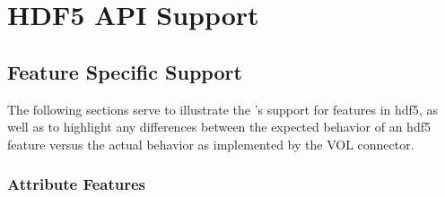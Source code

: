 \documentclass[../users_guide.tex]{subfiles}
\begin{document}
\section{HDF5 API Support}

\subsection{Feature Specific Support}


The following sections serve to illustrate the \rvc{}'s support for features in \acrshort{hdf5}, as well as to highlight any differences between the expected behavior of an \acrshort{hdf5} feature versus the actual behavior as implemented by the VOL connector.

\subsubsection{Attribute Features}
\end{document}
